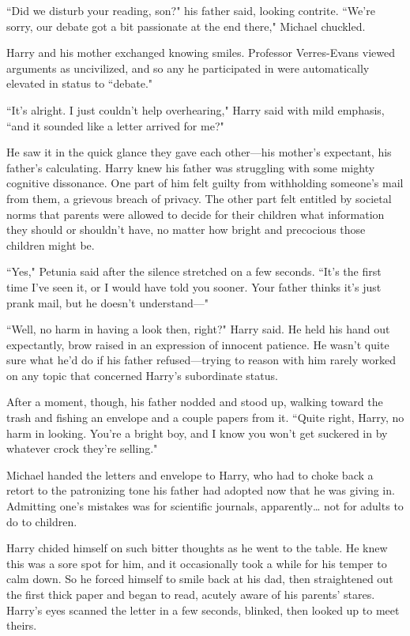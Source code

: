 ``Did we disturb your reading, son?" his father said, looking
contrite. ``We're sorry, our debate got a bit passionate at
the end there," Michael chuckled.

Harry and his mother exchanged knowing smiles. Professor
Verres-Evans viewed arguments as uncivilized, and so any
he participated in were automatically elevated in status to
``debate."

``It's alright. I just couldn't help overhearing,"
Harry said with mild emphasis, ``and it sounded like a letter
arrived for me?"

He saw it in the quick glance they gave each other---his
mother's expectant, his father's calculating. Harry knew his
father was struggling with some mighty cognitive
dissonance. One part of him felt guilty from withholding
someone's mail from them, a grievous breach of privacy.
The other part felt entitled by societal norms that parents
were allowed to decide for their children what information
they should or shouldn't have, no matter how bright and
precocious those children might be.

``Yes," Petunia said after the silence stretched on a few
seconds. ``It's the first time I've seen it, or I would have
told you sooner. Your father thinks it's just prank mail, but
he doesn't understand---"

``Well, no harm in having a look then, right?" Harry said.
He held his hand out expectantly, brow raised in an
expression of innocent patience. He wasn't quite sure what
he'd do if his father refused---trying to reason with him
rarely worked on any topic that concerned Harry's
subordinate status.

After a moment, though, his father nodded and stood up,
walking toward the trash and fishing an envelope and a
couple papers from it. ``Quite right, Harry, no harm in
looking. You're a bright boy, and I know you won't get
suckered in by whatever crock they're selling."

Michael handed the letters and envelope to Harry, who
had to choke back a retort to the patronizing tone his
father had adopted now that he was giving in. Admitting
one's mistakes was for scientific journals, apparently{\ldots} not
for adults to do to children.

Harry chided himself on such bitter thoughts as he went
to the table. He knew this was a sore spot for him, and it
occasionally took a while for his temper to calm down. So
he forced himself to smile back at his dad, then
straightened out the first thick paper and began to
read, acutely aware of his parents' stares.
Harry's eyes scanned the letter in a few seconds, blinked,
then looked up to meet theirs.

